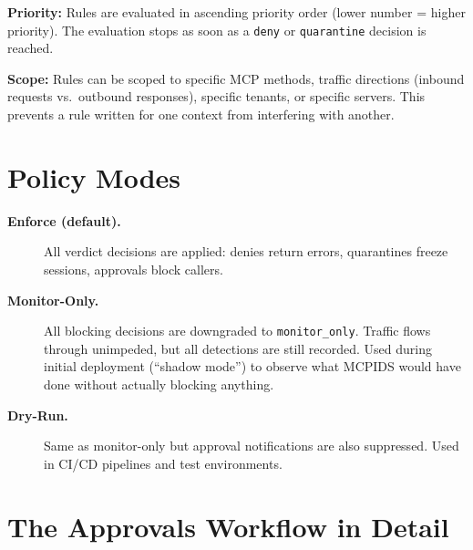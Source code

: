\documentclass[12pt,a4paper]{report}
\begin{document}
\textbf{Priority:} Rules are evaluated in ascending priority order (lower
number = higher priority). The evaluation stops as soon as a
\texttt{deny} or \texttt{quarantine} decision is reached.

\textbf{Scope:} Rules can be scoped to specific MCP methods, traffic
directions (inbound requests vs.\ outbound responses), specific tenants,
or specific servers. This prevents a rule written for one context from
interfering with another.

\section{Policy Modes}

\begin{description}
  \item[\textbf{Enforce (default).}] All verdict decisions are applied:
    denies return errors, quarantines freeze sessions, approvals block callers.

  \item[\textbf{Monitor-Only.}] All blocking decisions are downgraded to
    \texttt{monitor\_only}. Traffic flows through unimpeded, but all detections
    are still recorded. Used during initial deployment (``shadow mode'') to
    observe what MCPIDS would have done without actually blocking anything.

  \item[\textbf{Dry-Run.}] Same as monitor-only but approval notifications
    are also suppressed. Used in CI/CD pipelines and test environments.
\end{description}

\section{The Approvals Workflow in Detail}
\end{document}
